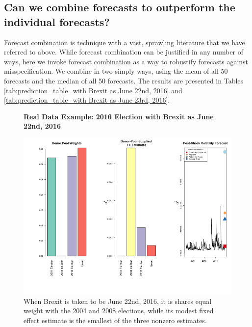 \documentclass[11pt,3p,review,authoryear]{elsarticle}
\theoremstyle{definition}
\begin{document}
\subsection{Can we combine forecasts to outperform the individual forecasts?}\label{forecastcomb}

Forecast combination is technique with a vast, sprawling literature that we have referred to above.  While forecast combination can be justified in any number of ways, here we invoke forecast combination as a way to robustify forecasts against misspecification.  We combine in two simply ways, using the mean of all 50 forecasts and the median of all 50 forecasts.  The results are presented in Tables \ref{tab:prediction_table_with Brexit as June 22nd, 2016} and \ref{tab:prediction_table_with Brexit as June 23rd, 2016}.

\begin{figure}[H]
  \begin{center}
    \textbf{Real Data Example: 2016 Election with Brexit as June 22nd, 2016}\par\medskip
    \includegraphics[scale=.6]{real_data_output_plots/FriMay311830182024_IYG_None_None.png}
    \caption{When Brexit is taken to be June 22nd, 2016, it is shares equal weight with the 2004 and 2008 elections, while its modest fixed effect estimate is the smallest of the three nonzero estimates.}
    \label{fig:SVF_2016_with_Brexit}
    \end{center}
  \end{figure}


  
\end{document}
